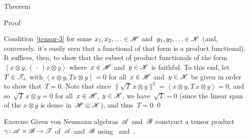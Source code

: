 \documentclass[a]{subfiles}
\begin{document}
\begin{parsec}
\begin{point}{Theorem}
\begin{point}{Proof}
\begin{point}{Condition~\ref{tensor-3}}
for some $x_1,x_2,\dotsc\in\mathscr{H}$
and~$y_1,y_2,\dotsc\in\mathscr{K}$
(and, conversely, it's easily seen
that a functional
of that form
is a product functional).
It suffices,
then,
to show that the subset of
product functionals
of the  form $\left<x\otimes y,(\,\cdot\,)x\otimes y\right>$
where~$x\in\mathscr{H}$ and~$y\in\mathscr{K}$ is faithful.
To this end,
let~$T\in\mathscr{T}_+$
with $\left< x\otimes y, Tx\otimes y\right>=0$
for all~$x\in\mathscr{H}$ and~$y\in\mathscr{K}$ be given
in order to show that~$T=0$.
Note that since
$\|\sqrt{T}\,x\otimes y\|^2=\left<x\otimes y,T\,x\otimes y\right>
=0$, and so~$\sqrt{T}\,x\otimes y=0$
for all~$x\in\mathscr{H}$, $y\in \mathscr{K}$,
we have~$\sqrt{T}=0$ (since the linear
span of the $x\otimes y$ is dense in~$\mathscr{H}\otimes\mathscr{K}$),
and thus~$T=0$.\qed
\end{point}
\end{point}
\end{point}
\begin{point}{Exercise}%
Given von Neumann algebras~$\mathscr{A}$ and~$\mathscr{B}$
construct a tensor product~$\gamma\colon \mathscr{A}\times \mathscr{B}\to\mathscr{T}$
of~$\mathscr{A}$ and~$\mathscr{B}$
using~ and~.
\end{point}
\end{parsec}
\end{document}
